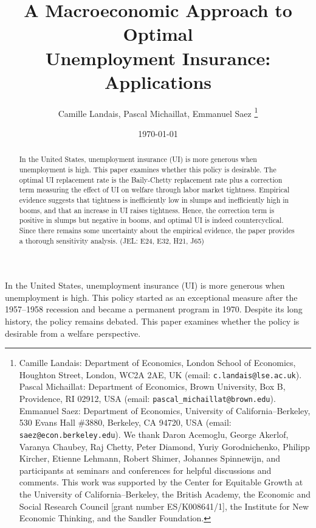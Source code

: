 \documentclass[letterpaper,12pt,leqno]{article}
\begin{document}
\title{A Macroeconomic Approach to Optimal\\Unemployment Insurance: Applications}
\author{Camille Landais, Pascal Michaillat, Emmanuel Saez
\thanks{Camille Landais: Department of Economics, London School of Economics, Houghton Street, London, WC2A 2AE, UK (email: \nolinkurl{c.landais@lse.ac.uk}). Pascal Michaillat: Department of Economics, Brown University, Box B, Providence, RI 02912, USA (email: \nolinkurl{pascal_michaillat@brown.edu}). Emmanuel Saez: Department of Economics, University of California--Berkeley, 530 Evans Hall \#3880, Berkeley, CA 94720, USA (email: \nolinkurl{saez@econ.berkeley.edu}). We thank Daron Acemoglu, George Akerlof, Varanya Chaubey, Raj Chetty, Peter Diamond, Yuriy Gorodnichenko, Philipp Kircher, Etienne Lehmann, Robert Shimer, Johannes Spinnewijn, and participants at seminars and conferences for helpful discussions and comments. This work was supported by the Center for Equitable Growth at the University of California--Berkeley, the British Academy, the Economic and Social Research Council [grant number ES/K008641/1], the Institute for New Economic Thinking, and the Sandler Foundation.}}
\date{\today}

\maketitle\begin{abstract} 

In the United States, unemployment insurance (UI) is more generous when unemployment is high. This paper examines whether this policy is desirable. The optimal UI replacement rate is the Baily-Chetty replacement rate plus a correction term measuring the effect of UI on welfare through labor market tightness. Empirical evidence suggests that tightness is inefficiently low in slumps and inefficiently high in booms, and that an increase in UI raises tightness. Hence, the correction term is positive in slumps but negative in booms, and optimal UI is indeed countercyclical. Since there remains some uncertainty about the empirical evidence, the paper provides a thorough sensitivity analysis. (JEL: E24, E32, H21, J65)

\end{abstract}\newpage

In the United States, unemployment insurance (UI) is more generous when unemployment is high. This policy started as an exceptional measure after the 1957--1958 recession and became a permanent program in 1970. Despite its long history, the policy remains debated. This paper examines whether the policy is desirable from a welfare perspective.
\end{document}
